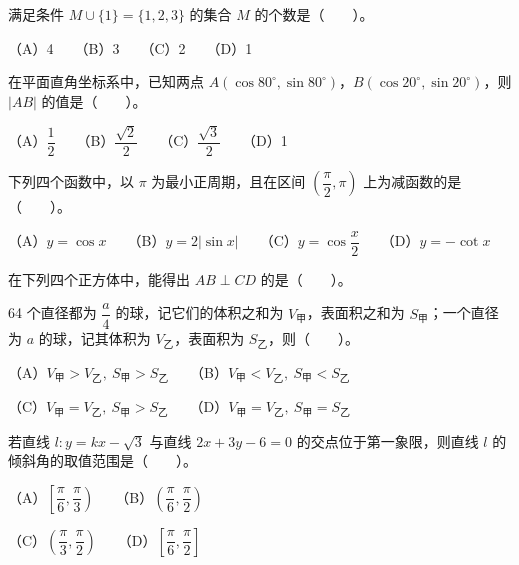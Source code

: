 \begin{question}
满足条件 \(M\cup\{1\}=\{1,2,3\}\) 的集合 \(M\) 的个数是\mbox{（　　）}。

（A）4　　（B）3　　（C）2　　（D）1

\end{question}
\begin{question}
在平面直角坐标系中，已知两点 \(A(\cos80^\circ,\sin80^\circ)\)，\(B(\cos20^\circ,\sin20^\circ)\)，则 \(|AB|\) 的值是\mbox{（　　）}。

（A）\(\dfrac12\)　　（B）\(\dfrac{\sqrt2}{2}\)　　（C）\(\dfrac{\sqrt3}{2}\)　　（D）1

\end{question}
\begin{question}
下列四个函数中，以 \(\pi\) 为最小正周期，且在区间 \(\left(\dfrac\pi2,\pi\right)\) 上为减函数的是\mbox{（　　）}。

（A）\(y=\cos x\)　　（B）\(y=2|\sin x|\)　　（C）\(y=\cos\dfrac{x}{2}\)　　（D）\(y=-\cot x\)

\Needspace{0.4\textheight}
\end{question}
\begin{question}
在下列四个正方体中，能得出 \(AB\perp CD\) 的是\mbox{（　　）}。
\nopagebreak[4]
\begin{center}\end{center}
\nopagebreak[4]
\end{question}
\begin{question}
64 个直径都为 \(\dfrac a4\) 的球，记它们的体积之和为 \(V_{\text{甲}}\)，表面积之和为 \(S_{\text{甲}}\)；一个直径为 \(a\) 的球，记其体积为 \(V_{\text{乙}}\)，表面积为 \(S_{\text{乙}}\)，则\mbox{（　　）}。

（A）\(V_{\text{甲}}>V_{\text{乙}},\ S_{\text{甲}}>S_{\text{乙}}\)　　（B）\(V_{\text{甲}}<V_{\text{乙}},\ S_{\text{甲}}<S_{\text{乙}}\)

（C）\(V_{\text{甲}}=V_{\text{乙}},\ S_{\text{甲}}>S_{\text{乙}}\)　　（D）\(V_{\text{甲}}=V_{\text{乙}},\ S_{\text{甲}}=S_{\text{乙}}\)

\end{question}
\begin{question}
若直线 \(l:y=kx-\sqrt3\) 与直线 \(2x+3y-6=0\) 的交点位于第一象限，则直线 \(l\) 的倾斜角的取值范围是\mbox{（　　）}。

（A）\(\left[\dfrac\pi6,\dfrac\pi3\right)\)　　（B）\(\left(\dfrac\pi6,\dfrac\pi2\right)\)

（C）\(\left(\dfrac\pi3,\dfrac\pi2\right)\)　　（D）\(\left[\dfrac\pi6,\dfrac\pi2\right]\)

\end{question}
